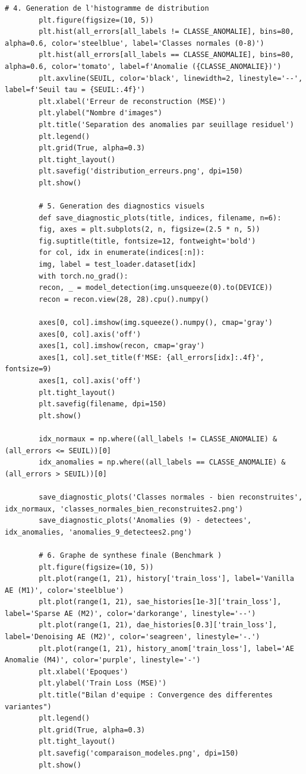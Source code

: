 \documentclass[11pt,a4paper]{report}
\begin{document}
\begin{lstlisting}[caption=Pipeline complet de détection d'anomalies et de synthèse comparative]
		# 4. Generation de l'histogramme de distribution
		plt.figure(figsize=(10, 5))
		plt.hist(all_errors[all_labels != CLASSE_ANOMALIE], bins=80, alpha=0.6, color='steelblue', label='Classes normales (0-8)')
		plt.hist(all_errors[all_labels == CLASSE_ANOMALIE], bins=80, alpha=0.6, color='tomato', label=f'Anomalie ({CLASSE_ANOMALIE})')
		plt.axvline(SEUIL, color='black', linewidth=2, linestyle='--', label=f'Seuil tau = {SEUIL:.4f}')
		plt.xlabel('Erreur de reconstruction (MSE)')
		plt.ylabel("Nombre d'images")
		plt.title('Separation des anomalies par seuillage residuel')
		plt.legend()
		plt.grid(True, alpha=0.3)
		plt.tight_layout()
		plt.savefig('distribution_erreurs.png', dpi=150)
		plt.show()
		
		# 5. Generation des diagnostics visuels 
		def save_diagnostic_plots(title, indices, filename, n=6):
		fig, axes = plt.subplots(2, n, figsize=(2.5 * n, 5))
		fig.suptitle(title, fontsize=12, fontweight='bold')
		for col, idx in enumerate(indices[:n]):
		img, label = test_loader.dataset[idx]
		with torch.no_grad():
		recon, _ = model_detection(img.unsqueeze(0).to(DEVICE))
		recon = recon.view(28, 28).cpu().numpy()
		
		axes[0, col].imshow(img.squeeze().numpy(), cmap='gray')
		axes[0, col].axis('off')
		axes[1, col].imshow(recon, cmap='gray')
		axes[1, col].set_title(f'MSE: {all_errors[idx]:.4f}', fontsize=9)
		axes[1, col].axis('off')
		plt.tight_layout()
		plt.savefig(filename, dpi=150)
		plt.show()
		
		idx_normaux = np.where((all_labels != CLASSE_ANOMALIE) & (all_errors <= SEUIL))[0]
		idx_anomalies = np.where((all_labels == CLASSE_ANOMALIE) & (all_errors > SEUIL))[0]
		
		save_diagnostic_plots('Classes normales - bien reconstruites', idx_normaux, 'classes_normales_bien_reconstruites2.png')
		save_diagnostic_plots('Anomalies (9) - detectees', idx_anomalies, 'anomalies_9_detectees2.png')
		
		# 6. Graphe de synthese finale (Benchmark )
		plt.figure(figsize=(10, 5))
		plt.plot(range(1, 21), history['train_loss'], label='Vanilla AE (M1)', color='steelblue')
		plt.plot(range(1, 21), sae_histories[1e-3]['train_loss'], label='Sparse AE (M2)', color='darkorange', linestyle='--')
		plt.plot(range(1, 21), dae_histories[0.3]['train_loss'], label='Denoising AE (M2)', color='seagreen', linestyle='-.')
		plt.plot(range(1, 21), history_anom['train_loss'], label='AE Anomalie (M4)', color='purple', linestyle='-')
		plt.xlabel('Epoques')
		plt.ylabel('Train Loss (MSE)')
		plt.title("Bilan d'equipe : Convergence des differentes variantes")
		plt.legend()
		plt.grid(True, alpha=0.3)
		plt.tight_layout()
		plt.savefig('comparaison_modeles.png', dpi=150)
		plt.show()
	\end{lstlisting}
\end{document}

